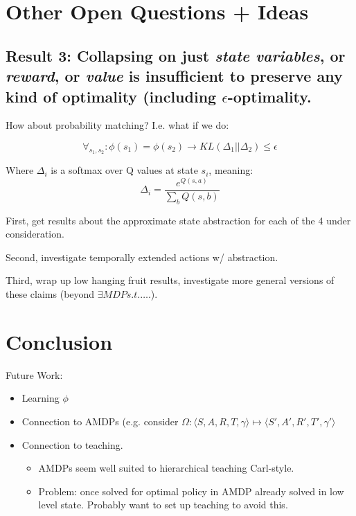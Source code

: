 \documentclass[11pt]{amsart}
\begin{document}
\newpage
\section{Other Open Questions + Ideas}


\subsection{Result 3: Collapsing on just {\it state variables}, or {\it reward}, or {\it value} is insufficient to preserve any kind of optimality (including $\epsilon$-optimality.}

 How about probability matching? I.e. what if we do:

\begin{equation}
\forall_{s_1,s_2} : \phi(s_1) = \phi(s_2) \rightarrow KL(\Delta_1 || \Delta_2) \leq \epsilon
\end{equation}

Where $\Delta_i$ is a softmax over Q values at state $s_i$, meaning:
\begin{equation}
\Delta_i = \frac{e^{Q(s,a)}}{\sum_b Q(s,b)}
\end{equation}




First, get results about the approximate state abstraction for each of the 4 under consideration.

Second, investigate temporally extended actions w/ abstraction.

Third, wrap up low hanging fruit results, investigate more general versions of these claims (beyond $\exists MDP s.t. \ldots$.).


\newpage
\section{Conclusion}

Future Work:
\begin{itemize}
\item Learning $\phi$
\item Connection to AMDPs (e.g. consider $\Omega : \langle S, A, R, T, \gamma \rangle \mapsto \langle S', A', R', T', \gamma' \rangle$
\item Connection to teaching.
\begin{itemize}
\item AMDPs seem well suited to hierarchical teaching Carl-style.
\item Problem: once solved for optimal policy in AMDP already solved in low level state. Probably want to set up teaching to avoid this.
\end{itemize}
\end{itemize}



\newpage

\end{document}

